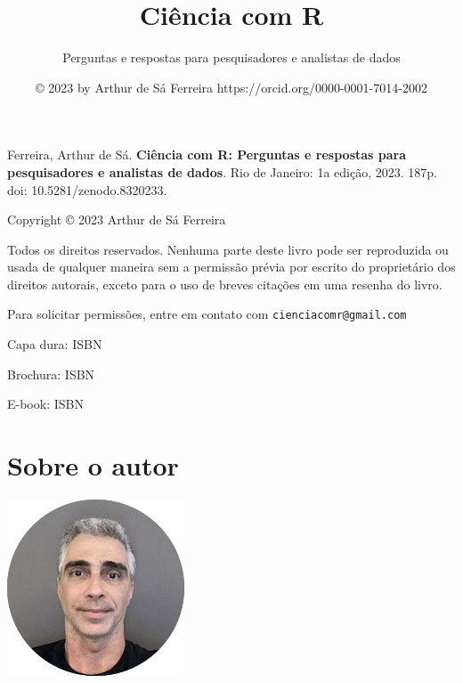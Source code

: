 \documentclass[
  a4paper,
]{book}
\title{\textbf{Ciência com R}}
\subtitle{Perguntas e respostas para pesquisadores e analistas de dados}
\author{© 2023 by Arthur de Sá Ferreira https://orcid.org/0000-0001-7014-2002}
\date{}
\renewcommand{\href}[2]{#2\footnote{\url{#1}}}
\newcommand{\DisableFootNotes}{%
  \renewcommand{\footnote}[2][]{\relax}
}
\begin{document}
\maketitle


\newpage


\newpage

{
\setcounter{tocdepth}{1}
\tableofcontents
}
\listoffigures
\listoftables
\DisableFootNotes

\clearpage
\markboth{}{}

Ferreira, Arthur de Sá. \textbf{Ciência com R: Perguntas e respostas para pesquisadores e analistas de dados}. Rio de Janeiro: 1a edição, 2023. 187p. \href{https://doi.org/10.5281/zenodo.8320233}{doi: 10.5281/zenodo.8320233}.

\vspace*{\fill}

Copyright © 2023 Arthur de Sá Ferreira

Todos os direitos reservados. Nenhuma parte deste livro pode ser reproduzida ou usada de qualquer maneira sem a permissão prévia por escrito do proprietário dos direitos autorais, exceto para o uso de breves citações em uma resenha do livro.

Para solicitar permissões, entre em contato com \href{mailto:cienciacomr@gmail.com}{\nolinkurl{cienciacomr@gmail.com}}

Capa dura: ISBN

Brochura: ISBN

E-book: ISBN

\hypertarget{sobre-o-autor}{%
\chapter*{Sobre o autor}\label{sobre-o-autor}}

\markboth{}{}

\includegraphics{images/ASF.png}
\end{document}
